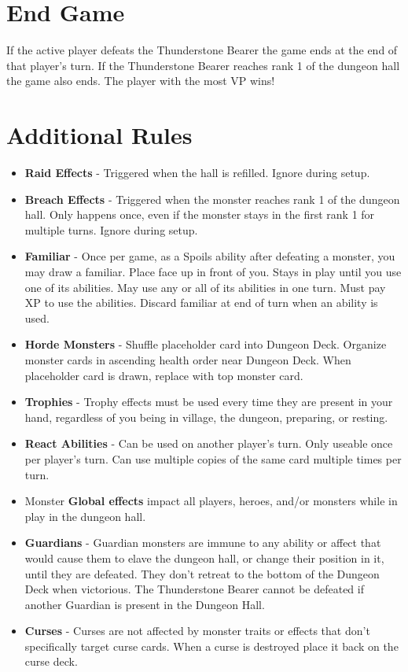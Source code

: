 \documentclass[12pt]{article}
\newenvironment{itemizeCustom}
{\begin{itemize}
  \setlength{\itemsep}{1pt}
  \setlength{\parskip}{0pt}
  \setlength{\parsep}{0pt}}
{\end{itemize}}
\begin{document}
\begin{multicols*}{2}
\section*{End Game}
If the active player defeats the Thunderstone Bearer the game ends at the end of that player's turn. If the Thunderstone Bearer reaches rank 1 of the dungeon hall the game also ends. The player with the most VP wins!

\newpage
\section*{Additional Rules}
\begin{itemizeCustom}
	\item \textbf{Raid Effects} - Triggered when the hall is refilled. Ignore during setup.
	\item \textbf{Breach Effects} - Triggered when the monster reaches rank 1 of the dungeon hall. Only happens once, even if the monster stays in the first rank 1 for multiple turns. Ignore during setup.
	\item \textbf{Familiar} - Once per game, as a Spoils ability after defeating a monster, you may draw a familiar. Place face up in front of you. Stays in play until you use one of its abilities. May use any or all of its abilities in one turn. Must pay XP to use the abilities. Discard familiar at end of turn when an ability is used.
	\item \textbf{Horde Monsters} - Shuffle placeholder card into Dungeon Deck. Organize monster cards in ascending health order near Dungeon Deck. When placeholder card is drawn, replace with top monster card.
	\item \textbf{Trophies} - Trophy effects must be used every time they are present in your hand, regardless of you being in village, the dungeon, preparing, or resting.
	\item \textbf{React Abilities} - Can be used on another player's turn. Only useable once per player's turn. Can use multiple copies of the same card multiple times per turn.
	\item Monster \textbf{Global effects} impact all players, heroes, and/or monsters while in play in the dungeon hall.
	\item \textbf{Guardians} - Guardian monsters are immune to any ability or affect that would cause them to elave the dungeon hall, or change their position in it, until they are defeated. They don't retreat to the bottom of the Dungeon Deck when victorious. The Thunderstone Bearer cannot be defeated if another Guardian is present in the Dungeon Hall.
	\item \textbf{Curses} - Curses are not affected by monster traits or effects that don't specifically target curse cards. When a curse is destroyed place it back on the curse deck.
\end{itemizeCustom}

\end{multicols*}
\end{document}
